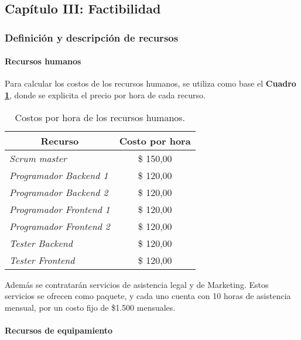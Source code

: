 \subsection{Capítulo III: Factibilidad}
\subsubsection{Definición y descripción de recursos}


\paragraph{Recursos humanos}

Para calcular los costos de los recursos humanos, se utiliza como base el \textbf{Cuadro \ref{costosRRHH}}, donde se explicita el precio por hora de cada recurso. 

\begin{table}[h]
\centering
\begin{tabular}{|l|c|}
\hline
\multicolumn{1}{|c|}{{\bf Recurso}} & {\bf Costo por hora} \\ \hline
{\it Scrum master}                  & \$ 150,00            \\ \hline
{\it Programador Backend 1}         & \$ 120,00            \\ \hline
{\it Programador Backend 2}         & \$ 120,00            \\ \hline
{\it Programador Frontend 1}        & \$ 120,00            \\ \hline
{\it Programador Frontend 2}        & \$ 120,00            \\ \hline
{\it Tester Backend}                & \$ 120,00            \\ \hline
{\it Tester Frontend}               & \$ 120,00            \\ \hline
\end{tabular}
\caption{Costos por hora de los recursos humanos.}
\label{costosRRHH}
\end{table}

Además se contratarán servicios de asistencia legal y de Marketing.
Estos servicios se ofrecen como paquete, y cada uno cuenta con 10 horas de asistencia mensual, por un costo fijo de \$1.500 mensuales.

\paragraph{Recursos de equipamiento}

